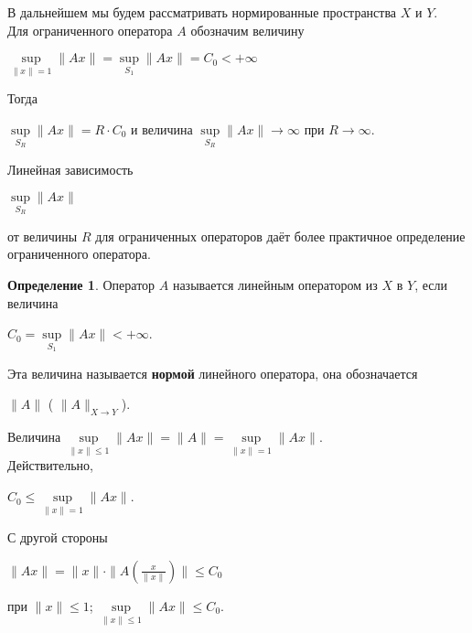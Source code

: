 \documentclass[12pt,a4paper,titlepage, oneside]{book}
\theoremstyle{definition}
\newtheorem*{definition}{Определение}
\theoremstyle{plain}
\theoremstyle{remark}
\theoremstyle{remark}
\theoremstyle{remark}
\theoremstyle{plain}
\theoremstyle{plain}
\begin{document}
В дальнейшем мы будем рассматривать нормированные пространства $X$ и $Y$.\\

Для ограниченного оператора $A$  обозначим величину 
\begin{center}
$\underset{\parallel x\parallel=1}{\sup}\parallel Ax \parallel =\underset{S_1}{\sup}\parallel Ax \parallel =C_0<+\infty$
\end{center}

Тогда
\begin{center}
$\underset{S_R}{\sup}\parallel Ax \parallel=R\cdot C_0$ 
и величина 
$\underset{S_R}{\sup}\parallel Ax \parallel\to\infty $ 
при $R\to\infty$.
\end{center}
Линейная зависимость
\begin{center}
$\underset{S_R}{\sup}\parallel Ax \parallel$ 
\end{center}
от величины $R$ для ограниченных операторов даёт более практичное определение ограниченного оператора.

\begin{definition} Оператор $A$ называется линейным оператором из $X$ в $Y$, если величина 
\begin{center}
$ C_0=\underset{S_1}{\sup}\parallel Ax \parallel<+\infty $.
\end{center}
\end{definition}

Эта величина называется \textbf{нормой} линейного оператора, она обозначается
\begin{center}
$\parallel A \parallel$ 
( $\parallel A \parallel _{X \to Y}$).
\end{center}

Величина $\underset{\parallel x\parallel \leq1}{\sup}\parallel Ax \parallel =
\parallel A \parallel =
\underset{\parallel x\parallel=1}{\sup}\parallel Ax \parallel$.\\

Действительно,
\begin{center}
$C_0\leq 
\underset{\parallel x\parallel=1}{\sup}\parallel Ax \parallel$.
\end{center}

С другой стороны 
\begin{center}
$\parallel Ax \parallel=
\parallel x \parallel \cdot \parallel A(\frac{x}{\parallel x \parallel}) \parallel \leq C_0$
\end{center} 
при $\parallel x \parallel \leq 1$; 
$\underset{\parallel x\parallel \leq 1}{\sup}\parallel Ax \parallel \leq C_0$.\\
\end{document}
